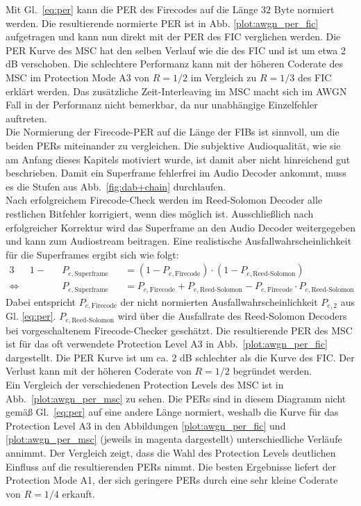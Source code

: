 Mit Gl.~\ref{eq:per} kann die PER des Firecodes auf die Länge $32$ Byte normiert werden. Die resultierende normierte PER ist in Abb. \ref{plot:awgn_per_fic} aufgetragen und kann nun direkt mit der PER des FIC verglichen werden. Die PER Kurve des MSC hat den selben Verlauf wie die des FIC und ist um etwa 2 dB verschoben. Die schlechtere Performanz kann mit der höheren Coderate des MSC im Protection Mode A3 von $R=1/2$ im Vergleich zu $R=1/3$ des FIC erklärt werden. Das zusätzliche Zeit-Interleaving im MSC macht sich im AWGN Fall in der Performanz nicht bemerkbar, da nur unabhängige Einzelfehler auftreten.\\

Die Normierung der Firecode-PER auf die Länge der FIBs ist sinnvoll, um die beiden PERs miteinander zu vergleichen. Die subjektive Audioqualität, wie sie am Anfang dieses Kapitels motiviert wurde, ist damit aber nicht hinreichend gut beschrieben. Damit ein Superframe fehlerfrei im Audio Decoder ankommt, muss es die Stufen aus Abb.~\ref{fig:dab+chain} durchlaufen.\\
Nach erfolgreichem Firecode-Check werden im Reed-Solomon Decoder alle restlichen Bitfehler korrigiert, wenn dies möglich ist. Ausschließlich nach erfolgreicher Korrektur wird das Superframe an den Audio Decoder weitergegeben und kann zum Audiostream beitragen. Eine realistische Ausfallwahrscheinlichkeit für die Superframes ergibt sich wie folgt:
\begin{alignat}{3}
&1-&&P_{e,\text{Superframe}} &&= (1-P_{e,\text{Firecode}}) \cdot (1-P_{e, \text{Reed-Solomon}})\nonumber \\
\Leftrightarrow\; & &&P_{e, \text{Superframe}} &&= P_{e,\text{Firecode}} + P_{e, \text{Reed-Solomon}} - P_{e,\text{Firecode}}\cdot P_{e, \text{Reed-Solomon}}
\label{eq:per_superframe}
\end{alignat}
Dabei entspricht $P_{e,\text{Firecode}}$ der nicht normierten Ausfallwahrscheinlichkeit $P_{e,2}$ aus Gl. \ref{eq:per}. $P_{e,\text{Reed-Solomon}}$ wird über die Ausfallrate des Reed-Solomon Decoders bei vorgeschaltenem Firecode-Checker geschätzt. Die resultierende PER des MSC ist für das oft verwendete Protection Level A3 in Abb.~\ref{plot:awgn_per_fic} dargestellt. Die PER Kurve ist um ca. 2 dB schlechter als die Kurve des FIC. Der Verlust kann mit der höheren Coderate von $R=1/2$ begründet werden.\\

Ein Vergleich der verschiedenen Protection Levels des MSC ist in Abb.~\ref{plot:awgn_per_msc} zu sehen. Die PERs sind in diesem Diagramm nicht gemäß Gl.~\ref{eq:per} auf eine andere Länge normiert, weshalb die Kurve für das Protection Level A3 in den Abbildungen \ref{plot:awgn_per_fic} und \ref{plot:awgn_per_msc} (jeweils in magenta dargestellt) unterschiedliche Verläufe annimmt. Der Vergleich zeigt, dass die Wahl des Protection Levels deutlichen Einfluss auf die resultierenden PERs nimmt. Die besten Ergebnisse liefert der Protection Mode A1, der sich geringere PERs durch eine sehr kleine Coderate von $R=1/4$ erkauft.

